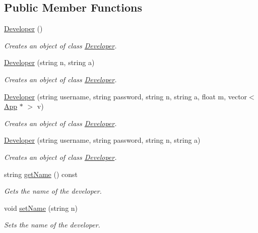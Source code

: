 \subsection*{Public Member Functions}
\begin{DoxyCompactItemize}
\item 
\hyperlink{class_developer_a1acf937b03598b68b93c010bfc90f702}{Developer} ()
\begin{DoxyCompactList}\small\item\em Creates an object of class \hyperlink{class_developer}{Developer}. \end{DoxyCompactList}\item 
\hyperlink{class_developer_a9e6851b29e5e3eddb65d3fead20fcc11}{Developer} (string n, string a)
\begin{DoxyCompactList}\small\item\em Creates an object of class \hyperlink{class_developer}{Developer}. \end{DoxyCompactList}\item 
\hyperlink{class_developer_a566bc9559532a39eb343bae605d81dbb}{Developer} (string username, string password, string n, string a, float m, vector$<$ \hyperlink{class_app}{App} $\ast$ $>$ v)
\begin{DoxyCompactList}\small\item\em Creates an object of class \hyperlink{class_developer}{Developer}. \end{DoxyCompactList}\item 
\hyperlink{class_developer_a22955164da669fdfb4e2993031c7ac3b}{Developer} (string username, string password, string n, string a)
\begin{DoxyCompactList}\small\item\em Creates an object of class \hyperlink{class_developer}{Developer}. \end{DoxyCompactList}\item 
string \hyperlink{class_developer_ab596fa3410bc9ec868ae57cf81461ce7}{get\-Name} () const 
\begin{DoxyCompactList}\small\item\em Gets the name of the developer. \end{DoxyCompactList}\item 
void \hyperlink{class_developer_a98717ed7e5e6f72e24ec49d210c2e086}{set\-Name} (string n)
\begin{DoxyCompactList}\small\item\em Sets the name of the developer. \end{DoxyCompactList}\item 

\end{DoxyCompactItemize}

